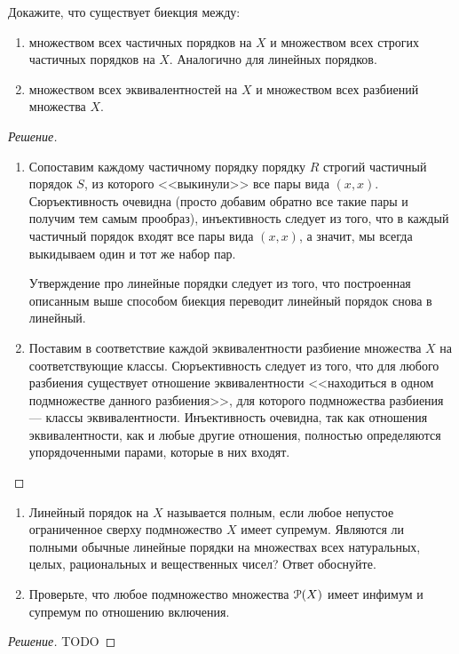     \begin{problem}[3]
        Докажите, что существует биекция между:
        \begin{enumerate}[label=(\alph{*})]
            \item множеством всех частичных порядков на \(X\) и множеством всех строгих частичных порядков на \(X\). Аналогично для линейных порядков.
            \item множеством всех эквивалентностей на \(X\) и множеством всех разбиений множества \(X\).
        \end{enumerate}
    \end{problem}
    \begin{proof}[Решение]
        \begin{enumerate}[label=(\alph{*})]
            \item Сопоставим каждому частичному порядку порядку \(R\) строгий частичный порядок \(S\), из которого <<выкинули>> все пары вида \((x, x)\). Сюръективность очевидна (просто добавим обратно все такие пары и получим тем самым прообраз), инъективность следует из того, что в каждый частичный порядок входят все пары вида \((x, x)\), а значит, мы всегда выкидываем один и тот же набор пар.

            Утверждение про линейные порядки следует из того, что построенная описанным выше способом биекция переводит линейный порядок снова в линейный.
            \item Поставим в соответствие каждой эквивалентности разбиение множества \(X\) на соответствующие классы. Сюръективность следует из того, что для любого разбиения существует отношение эквивалентности <<находиться в одном подмножестве данного разбиения>>, для которого подмножества разбиения --- классы эквивалентности. Инъективность очевидна, так как отношения эквивалентности, как и любые другие отношения, полностью определяются упорядоченными парами, которые в них входят.
        \end{enumerate}
    \end{proof}

    \begin{problem}[4]
        \begin{enumerate}[label=(\alph{*})]
            \item Линейный порядок на \(X\) называется полным, если любое непустое ограниченное сверху подмножество \(X\) имеет супремум. Являются ли полными обычные линейные порядки на множествах всех натуральных, целых, рациональных и вещественных чисел? Ответ обоснуйте.
            \item Проверьте, что любое подмножество множества \(\operatorname{\mathcal{P}}(X)\) имеет инфимум и супремум по отношению включения.
        \end{enumerate}
    \end{problem}
    \begin{proof}[Решение]
        TODO
    \end{proof}

